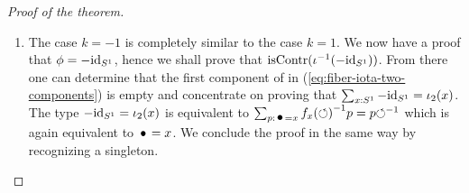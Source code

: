 \documentclass[english,a4paper]{tufte-handout}
\def\U{\universe U}%
\begin{document}
\begin{proof}[Proof of the theorem]
\begin{enumerate}
  \item The case $k=-1$ is completely similar to the case $k=1$. We
    now have a proof that $\phi = -\mathord{\mathrm{id}}_{S^1}$, hence we shall prove that
    $\mathrm{isContr}({\iota}^{-1}(-\mathord{\mathrm{id}}_{S^1}))$. From there one can determine that
    the first component of in (\ref{eq:fiber-iota-two-components}) is
    empty and concentrate on proving that
    $\sum_{x:{S^1}}-\mathord{\mathrm{id}}_{S^1} = \iota_2(x)$. The type
    $-\mathord{\mathrm{id}}_{S^1} = \iota_2(x)$ is equivalent to
    $\sum_{p:\base = x}\inv{f_x(\Sloop)}p=p\inv\Sloop$ which is again
    equivalent to $\base=x$. We conclude the proof in the same way by
    recognizing a singleton.
  \end{enumerate}
\end{proof}
\end{document}
